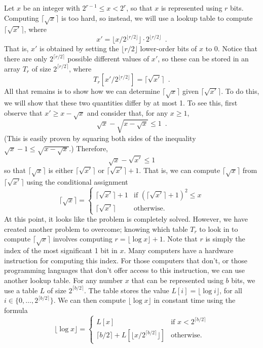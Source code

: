 Let $x$ be an integer with $2^{r-1} \le x < 2^r$, so that $x$ is
represented using $r$ bits.  Computing $\lceil\sqrt{x}\rceil$
is too hard, so instead, we will use a lookup table to compute
$\lceil\sqrt{x'}\rceil$, where
\[
   x'= \lfloor x/2^{\lfloor r/2\rfloor}\rfloor\cdot2^{\lfloor r/2\rfloor} \enspace .
\] 
That is, $x'$ is obtained by setting the $\lfloor r/2\rfloor$ lower-order
bits of $x$ to 0.   Notice that there are only $2^{\lceil r/2\rceil}$
possible different values of $x'$, so these can be stored in an array
$T_r$ of size $2^{\lceil r/2\rceil}$, where
\[
  T_r\left[x'/2^{\lfloor r/2\rfloor}\right]=\lceil\sqrt{x'}\rceil \enspace .
\] 
All that remains is to show how we can determine  $\lceil\sqrt{x}\rceil$
given $\lceil\sqrt{x'}\rceil$. To do this, we will show that these
two quantities differ by at most 1.  To see this, first observe that $x'
\ge x-\sqrt{x}$ and consider that, for any $x \ge 1$,
\[
       \sqrt{x} - \sqrt{x-\sqrt{x}} \le 1 \enspace .
\]
(This is easily proven by squaring both sides of the inequality
$\sqrt{x}-1 \le  \sqrt{x-\sqrt{x}}$.)  Therefore,
\[
  \sqrt{x} - \sqrt{x'} \le 1
\]
so that $\lceil\sqrt{x}\rceil$ is either $\lceil\sqrt{x'}\rceil$
or $\lceil\sqrt{x'}\rceil+1$.  That is, we can compute
$\lceil\sqrt{x}\rceil$ from $\lceil\sqrt{x'}\rceil$ using the
conditional assignment
\[
   \lceil\sqrt{x}\rceil
     = \left\{\begin{array}{ll} 
         \lceil\sqrt{x'}\rceil+1
            & \mbox{if $(\lceil\sqrt{x'}\rceil+1)^2 \le x$} \\
         \lceil\sqrt{x'}\rceil 
            & \mbox{otherwise.}
       \end{array}\right. 
\]
At this point, it looks like the problem is completely solved. However,
we have created another problem to overcome; knowing which table $T_r$
to look in to compute $\lceil\sqrt{x}\rceil$ involves computing
$r=\lfloor \log x\rfloor + 1$.  Note that $r$ is simply the index of the
most significant 1 bit in $x$.  Many computers have a hardware instruction
for computing this index. For those computers that don't, or those
programming languages that don't offer access to this instruction, we can
use another lookup table.  For any number $x$ that can be represented using
$b$ bits, we use a table $L$ of size $2^{\lceil b/2\rceil}$.
The table stores the value $L[i] = \lfloor \log i\rfloor$, for all
$i\in\{0,\ldots,2^{\lceil{b/2}\rceil}\}$.  We can then compute $\lfloor\log
x\rfloor$ in constant time using the formula
\[
    \lfloor\log x\rfloor
     = \left\{\begin{array}{ll} 
         L[x] 
            & \mbox{if $x< 2^{\lceil b/2\rceil}$} \\
         \lceil b/2\rceil+L[\lfloor x/2^{\lceil b/2\rceil}\rfloor] 
            & \mbox{otherwise.}
       \end{array}\right .
\]

